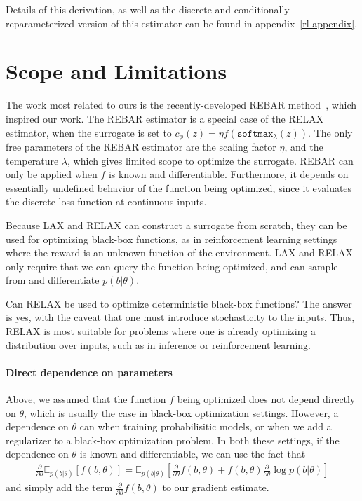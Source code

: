 \documentclass{article}
\newcommand{\E}{\mathbb{E}}
\newcommand{\PT}{\frac{\partial}{\partial \theta}}
\newcommand{\LAX}{{\textnormal{LAX}}}
\newcommand{\RELAX}{{\textnormal{RELAX}}}
\begin{document}
Details of this derivation, as well as the discrete and conditionally reparameterized version of this estimator can be found in appendix~\ref{rl appendix}.

\section{Scope and Limitations}
\label{limitations}
The work most related to ours is the recently-developed REBAR method~\citep{tucker2017rebar}, which inspired our work.
The REBAR estimator is a special case of the \RELAX{} estimator, when the surrogate is set to ${c_\phi(z) = \eta f(\texttt{softmax}_\lambda(z))}$.
The only free parameters of the REBAR estimator are the scaling factor $\eta$, and the temperature $\lambda$, which gives limited scope to optimize the surrogate.
REBAR can only be applied when $f$ is known and differentiable.
Furthermore, it depends on essentially undefined behavior of the function being optimized, since it evaluates the discrete loss function at continuous inputs.

Because \LAX{} and \RELAX{} can construct a surrogate from scratch, they can be used for optimizing black-box functions, as in reinforcement learning settings where the reward is an unknown function of the environment.
\LAX{} and \RELAX{} only require that we can query the function being optimized, and can sample from and differentiate $p(b|\theta)$.

Can \RELAX{} be used to optimize deterministic black-box functions?
The answer is yes, with the caveat that one must introduce stochasticity to the inputs.
Thus, \RELAX{} is most suitable for problems where one is already optimizing a distribution over inputs, such as in inference or reinforcement learning.

\paragraph{Direct dependence on parameters}
Above, we assumed that the function $f$ being optimized does not depend directly on $\theta$, which is usually the case in black-box optimization settings.
However, a dependence on $\theta$ can when training probabilisitic models, or when we add a regularizer to a black-box optimization problem.
In both these settings, if the dependence on $\theta$ is known and differentiable, we can use the fact that
%
\begin{align}
\PT \E_{p(b|\theta)}[f(b, \theta)] = \E_{p(b|\theta)}\left[\PT f(b, \theta) + f(b, \theta)\PT \log p(b|\theta) \right]
\end{align}
%
and simply add the term $\PT f(b, \theta)$ to our gradient estimate.
\end{document}
